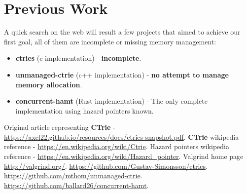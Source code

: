 \documentclass[dvips,12pt]{article}
\begin{document}
	\section{Previous Work}	
		A quick search on the web will result a few projects that aimed to achieve our first goal, all of them are incomplete or missing memory management:
		\begin{itemize}
			\item \textbf{ctries}\cite{ctries} (c implementation) - \textbf{incomplete}.
			\item \textbf{unmanaged-ctrie}\cite{unmanaged-ctrie} (c++ implementation) - \textbf{no attempt to manage memory allocation}.
			\item \textbf{concurrent-hamt}\cite{concurrent-hamt} (Rust implementation) - The only complete implementation using hazard pointers known.
		\end{itemize}
		
	\begin{thebibliography}{99}
		 Original article representing \textbf{CTrie} - \url{https://axel22.github.io/resources/docs/ctries-snapshot.pdf}. 
		 \textbf{CTrie} wikipedia reference - \url{https://en.wikipedia.org/wiki/Ctrie}.
		 Hazard pointers wikipedia reference - \url{https://en.wikipedia.org/wiki/Hazard_pointer}.
		 Valgrind home page \url{http://valgrind.org/}.
		 \url{https://github.com/Gustav-Simonsson/ctries}.
		 \url{https://github.com/mthom/unmanaged-ctrie}.
		 \url{https://github.com/ballard26/concurrent-hamt}.
		
	\end{thebibliography}
	
	
	
\end{document}
